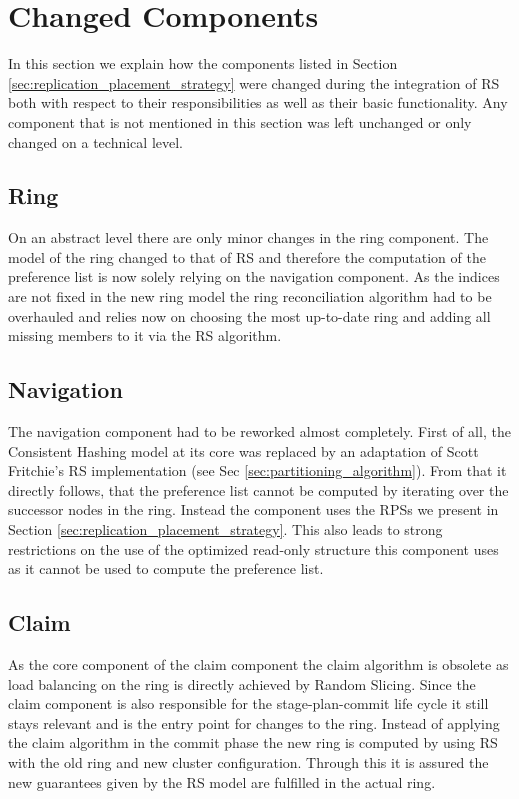 \section{Changed Components}
In this section we explain how the components listed in Section \ref{sec:replication_placement_strategy} were changed during the integration of \ac{RS} both with respect to their responsibilities as well as their basic functionality.
Any component that is not mentioned in this section was left unchanged or only changed on a technical level.

\subsection{Ring}
On an abstract level there are only minor changes in the ring component.
The model of the ring changed to that of \ac{RS} and therefore the computation of the preference list is now solely relying on the navigation component.
As the indices are not fixed in the new ring model the ring reconciliation algorithm had to be overhauled and relies now on choosing the most up-to-date ring and adding all missing members to it via the \ac{RS} algorithm.

\subsection{Navigation}
\label{sec:navigation_rslicing}
The navigation component had to be reworked almost completely.
First of all, the Consistent Hashing model at its core was replaced by an adaptation of Scott Fritchie's \ac{RS} implementation (see Sec \ref{sec:partitioning_algorithm}).
From that it directly follows, that the preference list cannot be computed by iterating over the successor nodes in the ring.
Instead the component uses the \acp{RPS} we present in Section \ref{sec:replication_placement_strategy}.
This also leads to strong restrictions on the use of the optimized read-only structure this component uses as it cannot be used to compute the preference list.

\subsection{Claim}
As the core component of the claim component the claim algorithm is obsolete as load balancing on the ring is directly achieved by Random Slicing.
Since the claim component is also responsible for the stage-plan-commit life cycle it still stays relevant and is the entry point for changes to the ring.
Instead of applying the claim algorithm in the commit phase the new ring is computed by using \ac{RS} with the old ring and new cluster configuration.
Through this it is assured the new guarantees given by the \ac{RS} model are fulfilled in the actual ring.



